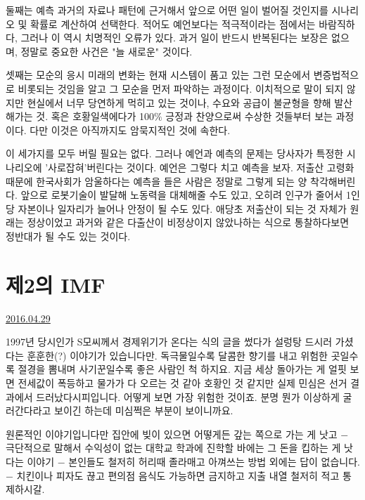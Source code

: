 둘째는 예측
과거의 자료나 패턴에 근거해서 앞으로 어떤 일이 벌어질 것인지를 시나리오 및 확률로 계산하여 선택한다.
적어도 예언보다는 적극적이라는 점에서는 바람직하다, 그러나 이 역시 치명적인 오류가 있다.
과거 일이 반드시 반복된다는 보장은 없으며, 정말로 중요한 사건은 "늘 새로운" 것이다.
\vspace{5mm}

셋째는 모순의 응시
미래의 변화는 현재 시스템이 품고 있는 그런 모순에서 변증법적으로 비롯되는 것임을 알고 그 모순을 먼저 파악하는 과정이다.
이치적으로 말이 되지 않지만 현실에서 너무 당연하게 먹히고 있는 것이나, 수요와 공급이 불균형을 향해 발산해가는 것.
혹은 호황일색에다가 100$\%$ 긍정과 찬양으로써 수상한 것들부터 보는 과정이다.
다만 이것은 아직까지도 암묵지적인 것에 속한다.
\vspace{5mm}

이 세가지를 모두 버릴 필요는 없다. 그러나 예언과 예측의 문제는 당사자가 특정한 시나리오에 '사로잡혀'버린다는 것이다.
예언은 그렇다 치고 예측을 보자. 저출산 고령화 때문에 한국사회가 암울하다는 예측을 들은 사람은 정말로 그렇게 되는 양 착각해버린다.
앞으로 로봇기술이 발달해 노동력을 대체해줄 수도 있고, 오히려 인구가 줄어서 1인당 자본이나 일자리가 늘어나 안정이 될 수도 있다.
애당초 저출산이 되는 것 자체가 원래는 정상이었고 과거와 같은 다출산이 비정상이지 않았나하는 식으로 통찰하다보면 정반대가 될 수도 있는 것이다.
\vspace{5mm}






\section{제2의 IMF}
\href{https://www.kockoc.com/Apoc/752253}{2016.04.29}

\vspace{5mm}

1997년 당시인가 S모씨께서 경제위기가 온다는 식의 글을 썼다가 설렁탕 드시러 가셨다는 훈훈한(?) 이야기가 있습니다만.
독극물일수록 달콤한 향기를 내고 위험한 곳일수록 절경을 뽐내며 사기꾼일수록 좋은 사람인 척 하지요.
지금 세상 돌아가는 게 얼핏 보면 전세값이 폭등하고 물가가 다 오르는 것 같아 호황인 것 같지만 실제 민심은 선거 결과에서 드러났다시피입니다.
어떻게 보면 가장 위험한 것이죠. 분명 뭔가 이상하게 굴러간다라고 보이긴 하는데 미심쩍은 부분이 보이니까요.
\vspace{5mm}

원론적인 이야기입니다만 집안에 빚이 있으면 어떻게든 갚는 쪽으로 가는 게 낫고
$-$ 극단적으로 말해서 수익성이 없는 대학교 학과에 진학할 바에는 그 돈을 킵하는 게 낫다는 이야기 $-$
본인들도 철저히 허리때 졸라매고 아껴쓰는 방법 외에는 답이 없습니다.
$-$ 치킨이나 피자도 끊고 편의점 음식도 가능하면 금지하고 지출 내열 철저히 적고 통제하시갈.
\vspace{5mm}

